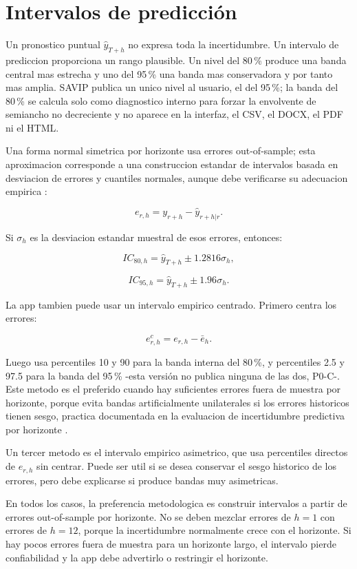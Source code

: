 ﻿\documentclass[12pt,letterpaper]{article}
\newcommand{\yhat}{\hat{y}}
\begin{document}
\section{Intervalos de predicción}

Un pronostico puntual \(\yhat_{T+h}\) no expresa toda la incertidumbre. Un intervalo de prediccion proporciona un rango plausible. Un nivel del 80\,\% produce una banda central mas estrecha y uno del 95\,\% una banda mas conservadora y por tanto mas amplia. SAVIP publica un unico nivel al usuario, el del 95\,\%; la banda del 80\,\% se calcula solo como diagnostico interno para forzar la envolvente de semiancho no decreciente y no aparece en la interfaz, el CSV, el DOCX, el PDF ni el HTML.

Una forma normal simetrica por horizonte usa errores out-of-sample; esta aproximacion corresponde a una construccion estandar de intervalos basada en desviacion de errores y cuantiles normales, aunque debe verificarse su adecuacion empirica \citep{hyndman2021fpp3}:

\[
e_{r,h}=y_{r+h}-\yhat_{r+h|r}.
\]

Si \(\sigma_h\) es la desviacion estandar muestral de esos errores, entonces:

\[
IC_{80,h}=\yhat_{T+h}\pm 1.2816\sigma_h,
\]

\[
IC_{95,h}=\yhat_{T+h}\pm 1.96\sigma_h.
\]

La app tambien puede usar un intervalo empirico centrado. Primero centra los errores:

\[
e^c_{r,h}=e_{r,h}-\bar{e}_h.
\]

Luego usa percentiles 10 y 90 para la banda interna del 80\,\%, y percentiles 2.5 y 97.5 para la banda del 95\,\% -esta versión no publica ninguna de las dos, P0-C-. Este metodo es el preferido cuando hay suficientes errores fuera de muestra por horizonte, porque evita bandas artificialmente unilaterales si los errores historicos tienen sesgo, practica documentada en la evaluacion de incertidumbre predictiva por horizonte \citep{hyndman2021fpp3}.

Un tercer metodo es el intervalo empirico asimetrico, que usa percentiles directos de \(e_{r,h}\) sin centrar. Puede ser util si se desea conservar el sesgo historico de los errores, pero debe explicarse si produce bandas muy asimetricas.

En todos los casos, la preferencia metodologica es construir intervalos a partir de errores out-of-sample por horizonte. No se deben mezclar errores de \(h=1\) con errores de \(h=12\), porque la incertidumbre normalmente crece con el horizonte. Si hay pocos errores fuera de muestra para un horizonte largo, el intervalo pierde confiabilidad y la app debe advertirlo o restringir el horizonte.
\end{document}
